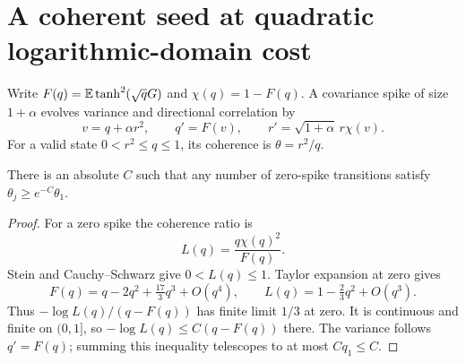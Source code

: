 \section{A coherent seed at quadratic logarithmic-domain cost}
\label{sec:canonical-spike-prefix}
Write $F(q)=\mathbb E\tanh^2(\sqrt qG)$ and $\chi(q)=1-F(q)$. A covariance spike of size $1+\alpha$ evolves variance and directional correlation by
\begin{equation}
 v=q+\alpha r^2,\qquad q'=F(v),\qquad
 r'=\sqrt{1+\alpha}\,r\chi(v).
 \label{eq:canonical-spike-update}
\end{equation}
For a valid state $0<r^2\le q\le1$, its coherence is $\theta=r^2/q$.

\begin{lemma}
\label{lem:native-coherence}
There is an absolute $C$ such that any number of zero-spike transitions satisfy $\theta_j\ge e^{-C}\theta_1$.
\end{lemma}
\begin{proof}
For a zero spike the coherence ratio is
\[
 L(q)=\frac{q\chi(q)^2}{F(q)}.
\]
Stein and Cauchy--Schwarz give $0<L(q)\le1$. Taylor expansion at zero gives
\[
 F(q)=q-2q^2+\tfrac{17}{3}q^3+O(q^4),\qquad
 L(q)=1-\tfrac23q^2+O(q^3).
\]
Thus $-\log L(q)/(q-F(q))$ has finite limit $1/3$ at zero. It is continuous and finite on $(0,1]$, so $-\log L(q)\le C(q-F(q))$ there. The variance follows $q'=F(q)$; summing this inequality telescopes to at most $Cq_1\le C$.
\end{proof}

